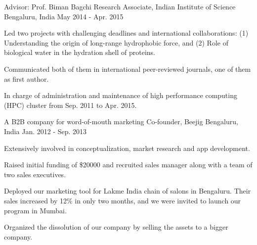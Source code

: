 \begin{cventries}
\cventry
{Advisor: Prof. Biman Bagchi} %
{Research Associate, Indian Institute of Science} %
{Bengaluru, India} %
{May 2014 - Apr. 2015} %
{ %
\begin{cvitems}
\item {Led two projects with challenging deadlines and international collaborations: (1) Understanding the origin of long-range hydrophobic force, and (2) Role of biological water in the hydration shell of proteins.}
\item {Communicated both of them in international peer-reviewed journals, one of them as first author.}
\item {In charge of administration and maintenance of high performance computing (HPC) cluster from Sep. 2011 to Apr. 2015.}
\end{cvitems}
}


\cventry
{A B2B company for word-of-mouth marketing} %
{Co-founder, Beejig} %
{Bengaluru, India} %
{Jan. 2012 - Sep. 2013} %
{ %
\begin{cvitems}
\item {Extensively involved in conceptualization, market research and app development.}
\item {Raised initial funding of \$20000 and recruited sales manager along with a team of two sales executives.}
\item {Deployed our marketing tool for Lakme India chain of salons in Bengaluru. Their sales increased by 12\% in only two months, and we were invited to launch our program in Mumbai.}
\item {Organized the dissolution of our company by selling the assets to a bigger company.}
\end{cvitems}
}


\end{cventries}
